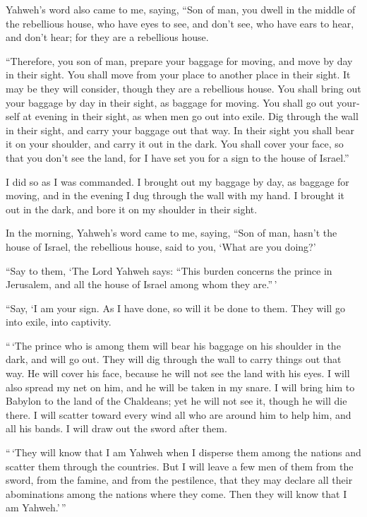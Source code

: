 \begin{paracol}{2}
\begin{otherlanguage}{english}
 Yahweh's word also came to me, saying, 
``Son of man, you dwell in the middle of the rebellious house, who have
eyes to see, and don't see, who have ears to hear, and don't hear; for
they are a rebellious house.

 ``Therefore, you son of man, prepare your baggage for
moving, and move by day in their sight. You shall move from your place
to another place in their sight. It may be they will consider, though
they are a rebellious house.  You shall bring out your
baggage by day in their sight, as baggage for moving. You shall go out
yourself at evening in their sight, as when men go out into exile.
 Dig through the wall in their sight, and carry your
baggage out that way.  In their sight you shall bear it on
your shoulder, and carry it out in the dark. You shall cover your face,
so that you don't see the land, for I have set you for a sign to the
house of Israel.''

 I did so as I was commanded. I brought out my baggage by
day, as baggage for moving, and in the evening I dug through the wall
with my hand. I brought it out in the dark, and bore it on my shoulder
in their sight.

 In the morning, Yahweh's word came to me, saying,
 ``Son of man, hasn't the house of Israel, the rebellious
house, said to you, `What are you doing?'

 ``Say to them, `The Lord Yahweh says: ``This burden
concerns the prince in Jerusalem, and all the house of Israel among whom
they are.''\,'

 ``Say, `I am your sign. As I have done, so will it be
done to them. They will go into exile, into captivity.

 ``\,`The prince who is among them will bear his baggage
on his shoulder in the dark, and will go out. They will dig through the
wall to carry things out that way. He will cover his face, because he
will not see the land with his eyes.  I will also spread
my net on him, and he will be taken in my snare. I will bring him to
Babylon to the land of the Chaldeans; yet he will not see it, though he
will die there.  I will scatter toward every wind all who
are around him to help him, and all his bands. I will draw out the sword
after them.

 ``\,`They will know that I am Yahweh when I disperse
them among the nations and scatter them through the countries.
 But I will leave a few men of them from the sword, from
the famine, and from the pestilence, that they may declare all their
abominations among the nations where they come. Then they will know that
I am Yahweh.'\,''


\end{otherlanguage}
\end{paracol}
